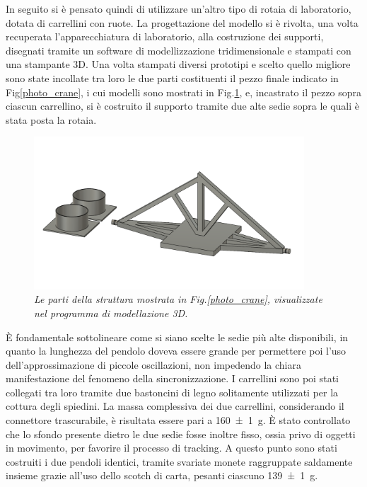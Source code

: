 \documentclass[11pt, a4paper, twoside]{article}
\begin{document}
In seguito si è pensato quindi di utilizzare un'altro tipo di rotaia di laboratorio, dotata
di carrellini con ruote.
La progettazione del modello si è rivolta, una volta recuperata l'apparecchiatura
di laboratorio, alla costruzione dei supporti, disegnati tramite un
software di modellizzazione tridimensionale e stampati con una stampante 3D.
Una volta stampati diversi prototipi e scelto quello migliore sono state incollate
tra loro le due parti costituenti il pezzo finale indicato in Fig\ref{photo_crane}, i cui modelli sono mostrati
in Fig.\ref{photo_piece}, e, 
incastrato il pezzo sopra ciascun carrellino, si è costruito il supporto tramite due alte sedie
sopra le quali è stata posta la rotaia. 
\begin{figure}[h!]
  \centering
  \includegraphics[width=0.9\textwidth]{../../media/img/fusion_project_cut.png}
  \caption{\textit{Le parti della struttura mostrata in Fig.\ref{photo_crane}, visualizzate nel programma
  di modellazione 3D.}}
  \label{photo_piece}
\end{figure}
È fondamentale sottolineare come si siano scelte le sedie più alte disponibili,
in quanto la lunghezza del pendolo doveva essere grande
per permettere poi l'uso dell'approssimazione di piccole oscillazioni,
non impedendo la chiara manifestazione del fenomeno della sincronizzazione.
I carrellini sono poi stati collegati tra loro tramite due bastoncini 
di legno solitamente utilizzati per la cottura degli spiedini.
La massa complessiva dei due carrellini, considerando il connettore trascurabile, è risultata essere pari a 
\SI{160 \pm 1}{\g}.
È stato controllato che lo sfondo presente dietro le
due sedie fosse inoltre fisso, ossia privo di oggetti
in movimento, per favorire il processo di tracking.
A questo punto sono stati costruiti i due pendoli identici, tramite svariate 
monete raggruppate saldamente insieme grazie all'uso dello scotch di carta, 
pesanti ciascuno \SI{139 \pm 1}{\g}.
\end{document}

